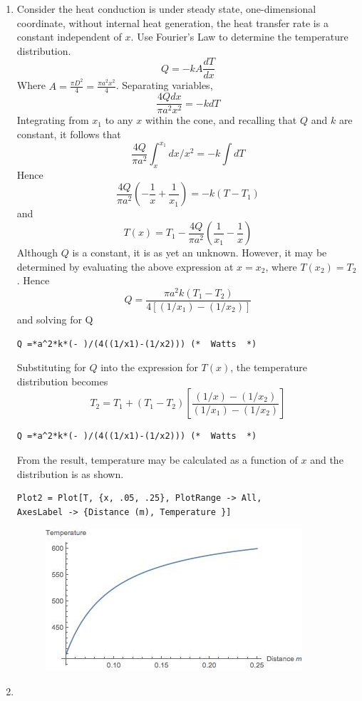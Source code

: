 \begin{solution}
\begin{enumerate}
\item
Consider the heat conduction is under steady state, one-dimensional coordinate,
without internal heat generation, the heat transfer rate is a constant independent
of $x$. Use Fourier’s Law to determine the temperature distribution.
$$Q=-kA\frac{dT}{dx}$$
Where $A=\frac{\pi D^2}{4}=\frac{\pi a^2x^2}{4}$. Separating variables,
$$\frac{4Qdx}{\pi a^2x^2}=-kdT$$
Integrating from $x_1$ to any $x$ within the cone, and recalling that $Q$ and $k$
are constant, it follows that
$$\frac{4Q}{\pi a^2}\int_x^{x_1} dx/x^2=-k\int dT$$
Hence
$$\frac{4Q}{\pi a^2}\left(-\frac{1}{x}+\frac{1}{x_1}\right)=-k\left(T-T_1\right)$$
and
$$T(x)=T_1-\frac{4Q}{\pi a^2}\left(\frac{1}{x_1}-\frac{1}{x}\right)$$
Although $Q$ is a constant, it is as yet an unknown.
However, it may be determined by evaluating the above expression at
$x=x_2$, where $T(x_2)=T_2$. Hence
$$Q=\frac{\pi a^2k(T_1-T_2)}{4[(1/x_1)-(1/x_2)]}$$
and solving for Q
\begin{lstlisting}
Q =*a^2*k*(- )/(4((1/x1)-(1/x2))) (*  Watts  *)
\end{lstlisting}
Substituting for $Q$ into the expression for $T(x)$,
the temperature distribution becomes
$$T_2=T_1+(T_1-T_2)\left[\frac{(1/x)-(1/x_2)}{(1/x_1)-(1/x_2)}\right]$$
\begin{lstlisting}
Q =*a^2*k*(- )/(4((1/x1)-(1/x2))) (*  Watts  *)
\end{lstlisting}
From the result, temperature may be calculated as a function of $x$
and the distribution is as shown.
\begin{lstlisting}
Plot2 = Plot[T, {x, .05, .25}, PlotRange -> All, 
AxesLabel -> {Distance (m), Temperature }]
\end{lstlisting}
\begin{figure}[h!]
  \centering
    \includegraphics[scale=0.6]{figures/ch2/4}
\end{figure}
\item

\end{enumerate}
\end{solution}
